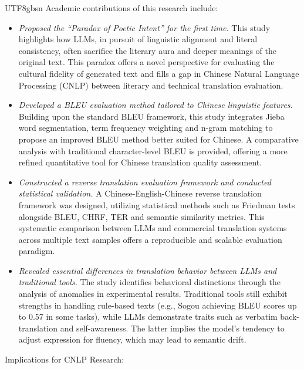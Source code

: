 \documentclass[conference]{IEEEtran}
\begin{document}
\begin{CJK}{UTF8}{gbsn}
Academic contributions of this research include:

\begin{itemize}
\item \textit{Proposed the ``Paradox of Poetic Intent'' for the first time.} This study highlights how LLMs, in pursuit of linguistic alignment and literal consistency, often sacrifice the literary aura and deeper meanings of the original text. This paradox offers a novel perspective for evaluating the cultural fidelity of generated text and fills a gap in Chinese Natural Language Processing (CNLP) between literary and technical translation evaluation. 
\item \textit{Developed a BLEU evaluation method tailored to Chinese linguistic features.} Building upon the standard BLEU framework, this study integrates Jieba word segmentation, term frequency weighting and n-gram matching to propose an improved BLEU method better suited for Chinese. A comparative analysis with traditional character-level BLEU is provided, offering a more refined quantitative tool for Chinese translation quality assessment.
\item \textit{Constructed a reverse translation evaluation framework and conducted statistical validation.} A Chinese-English-Chinese reverse translation framework was designed, utilizing statistical methods such as Friedman tests alongside BLEU, CHRF, TER and semantic similarity metrics. This systematic comparison between LLMs and commercial translation systems across multiple text samples offers a reproducible and scalable evaluation paradigm.
\item \textit{Revealed essential differences in translation behavior between LLMs and traditional tools.} The study identifies behavioral distinctions through the analysis of anomalies in experimental results. Traditional tools still exhibit strengths in handling rule-based texts (e.g., Sogou achieving BLEU scores up to 0.57 in some tasks), while LLMs demonstrate traits such as verbatim back-translation and self-awareness. The latter implies the model's tendency to adjust expression for fluency, which may lead to semantic drift.
\end{itemize}

Implications for CNLP Research:


\end{CJK}
\end{document}
